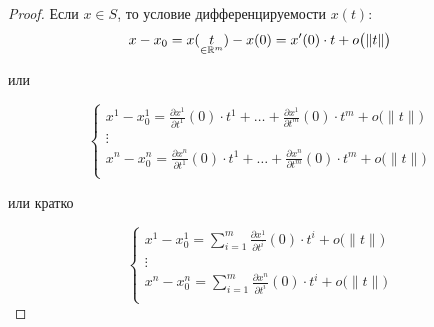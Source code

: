 \begin{proof}
    Если $x\in S$, то условие дифференцируемости $x(t)$:
    \[
        x-x_0 = x(\underset{\in\mathbb{R}^m}{t}) - x(0) = x'(0)\cdot t + o\big(\|t\|\big)
    \]
    \begin{center}
        или
    \end{center}
    \[
        \left\{\begin{array}{l}
            x^1 - x^1_0 = \frac{\partial x^1}{\partial t^1}(0)\cdot t^1 + \ldots + \frac{\partial x^1}{\partial t^m}(0)\cdot t^m + o\big(\|t\|\big) \\
            \vdots                                                                                                                          \\
            x^n - x^n_0 = \frac{\partial x^n}{\partial t^1}(0)\cdot t^1 + \ldots + \frac{\partial x^n}{\partial t^m}(0)\cdot t^m + o\big(\|t\|\big) \\
        \end{array}\right.
    \]
    \begin{center}
        или кратко
    \end{center}
    \begin{equation}\label{eq:26}
        \left\{\begin{array}{l}
            x^1 - x^1_0 = \sum_{i=1}^{m}\frac{\partial x^1}{\partial t^i}(0)\cdot t^i + o\big(\|t\|\big) \\
            \vdots                                                                                   \\
            x^n - x^n_0 = \sum_{i=1}^{m}\frac{\partial x^n}{\partial t^i}(0)\cdot t^i + o\big(\|t\|\big) \\
        \end{array}\right.
    \end{equation}


\end{proof}
